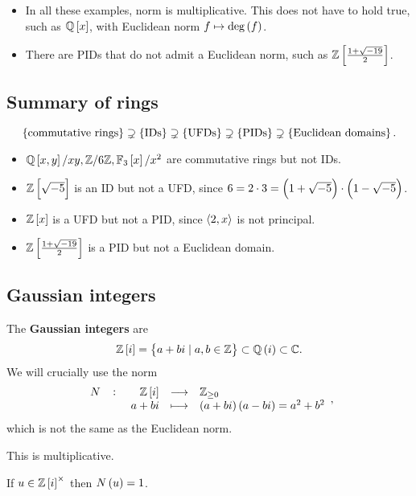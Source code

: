 \begin{remark*}
\hfill
\begin{itemize}
\item In all these examples, norm is multiplicative. This does not have to hold true, such as $ \Q\sbr{x} $, with Euclidean norm $ f \mapsto \deg\br{f} $.
\item There are PIDs that do not admit a Euclidean norm, such as $ \Z\sbr{\tfrac{1 + \sqrt{-19}}{2}} $.
\end{itemize}
\end{remark*}

\subsection{Summary of rings}

$$ \cbr{\text{commutative rings}} \supsetneq \cbr{\text{IDs}} \supsetneq \cbr{\text{UFDs}} \supsetneq \cbr{\text{PIDs}} \supsetneq \cbr{\text{Euclidean domains}}. $$
\begin{itemize}
\item $ \Q\sbr{x, y} / xy, \Z / 6\Z, \F_3\sbr{x} / x^2 $ are commutative rings but not IDs.
\item $ \Z\sbr{\sqrt{-5}} $ is an ID but not a UFD, since $ 6 = 2 \cdot 3 = \br{1 + \sqrt{-5}} \cdot \br{1 - \sqrt{-5}} $.
\item $ \Z\sbr{x} $ is a UFD but not a PID, since $ \left\langle 2, x \right\rangle $ is not principal.
\item $ \Z\sbr{\tfrac{1 + \sqrt{-19}}{2}} $ is a PID but not a Euclidean domain.
\end{itemize}

\pagebreak

\subsection{Gaussian integers}

The \textbf{Gaussian integers} are
$$ \Z\sbr{i} = \cbr{a + bi \mid a, b \in \Z} \subset \Q\br{i} \subset \C. $$
We will crucially use the norm
$$ \function[N]{\Z\sbr{i}}{\Z_{\ge 0}}{a + bi}{\br{a + bi}\br{a - bi} = a^2 + b^2}, $$
which is not the same as the Euclidean norm.

\begin{note*}
This is multiplicative.
\end{note*}

\begin{proposition}
If $ u \in \Z\sbr{i}^\times $ then $ N\br{u} = 1 $.
\end{proposition}

